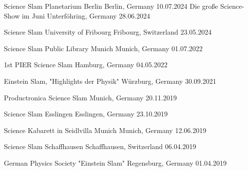 \begin{cvhonors}
\cvhonor
{Science Slam Planetarium Berlin} %
{Berlin, Germany} %
{} %
{10.07.2024} %
  \cvhonor
    {Die große Science-Show im Juni} %
    {Unterföhring, Germany} %
    {} %
    {28.06.2024} %
    
  \cvhonor
    {Science Slam University of Fribourg} %
    {Fribourg, Switzerland} %
    {} %
    {23.05.2024} %

  \cvhonor
    {Science Slam Public Library Munich} %
    {Munich, Germany} %
    {} %
    {01.07.2022} %

  \cvhonor
    {1st PIER Science Slam} %
    {Hamburg, Germany} %
    {} %
    {04.05.2022} %

  \cvhonor
    {Einstein Slam, "Highlights der Physik"} %
    {Würzburg, Germany} %
    {} %
    {30.09.2021} %

  \cvhonor
    {Productronica Science Slam} %
    {Munich, Germany} %
    {} %
    {20.11.2019} %

  \cvhonor
    {Science Slam Esslingen} %
    {Esslingen, Germany} %
    {} %
    {23.10.2019} %

\cvhonor
{Science Kabarett in Seidlvilla Munich} %
{Munich, Germany} %
{} %
{12.06.2019} %

\cvhonor
{Science Slam Schaffhausen} %
{Schaffhausen, Switzerland} %
{} %
{06.04.2019} %

\cvhonor
{German Physics Society "Einstein Slam"} %
{Regensburg, Germany} %
{} %
{01.04.2019} %


\end{cvhonors}
